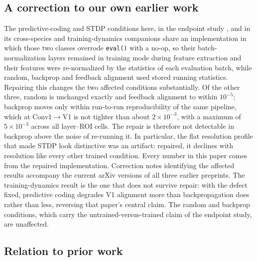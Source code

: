 \documentclass[10pt,twocolumn]{article}
\begin{document}
\subsection{A correction to our own earlier work}

The predictive-coding and STDP conditions here, in the endpoint study \citep{leutenegger2026}, and in its cross-species and training-dynamics companions share an implementation in which those two classes overrode \texttt{eval()} with a no-op, so their batch-normalization layers remained in training mode during feature extraction and their features were re-normalized by the statistics of each evaluation batch, while random, backprop and feedback alignment used stored running statistics. Repairing this changes the two affected conditions substantially. Of the other three, random is unchanged exactly and feedback alignment to within $10^{-5}$; backprop moves only within run-to-run reproducibility of the same pipeline, which at Conv1$\to$V1 is not tighter than about $2\times10^{-3}$, with a maximum of $5\times10^{-3}$ across all layer--ROI cells. The repair is therefore not detectable in backprop above the noise of re-running it. In particular, the flat resolution profile that made STDP look distinctive was an artifact: repaired, it declines with resolution like every other trained condition. Every number in this paper comes from the repaired implementation. Correction notes identifying the affected results accompany the current arXiv versions of all three earlier preprints. The training-dynamics result is the one that does not survive repair: with the defect fixed, predictive coding degrades V1 alignment more than backpropagation does rather than less, reversing that paper's central claim. The random and backprop conditions, which carry the untrained-versus-trained claim of the endpoint study, are unaffected.

\subsection{Relation to prior work}
\end{document}
